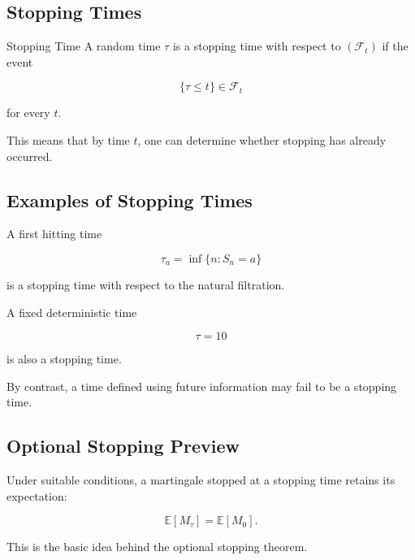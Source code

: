\subsection{Stopping Times}
\label{subsec:stopping-times}

\begin{definitionbox}{Stopping Time}
A random time \(\tau\) is a stopping time with respect to
\((\mathcal{F}_t)\) if the event

\[
\boxed{
\{\tau\leq t\}
\in
\mathcal{F}_t
}
\]

for every \(t\).
\end{definitionbox}

This means that by time \(t\), one can determine whether stopping has
already occurred.

\subsection{Examples of Stopping Times}
\label{subsec:stopping-time-examples}

A first hitting time

\[
\tau_a
=
\inf
\{
n:S_n=a
\}
\]

is a stopping time with respect to the natural filtration.

A fixed deterministic time

\[
\tau=10
\]

is also a stopping time.

By contrast, a time defined using future information may fail to be a
stopping time.

\subsection{Optional Stopping Preview}
\label{subsec:optional-stopping-preview}

Under suitable conditions, a martingale stopped at a stopping time
retains its expectation:

\[
\boxed{
\mathbb{E}[M_\tau]
=
\mathbb{E}[M_0].
}
\]

This is the basic idea behind the optional stopping theorem.

